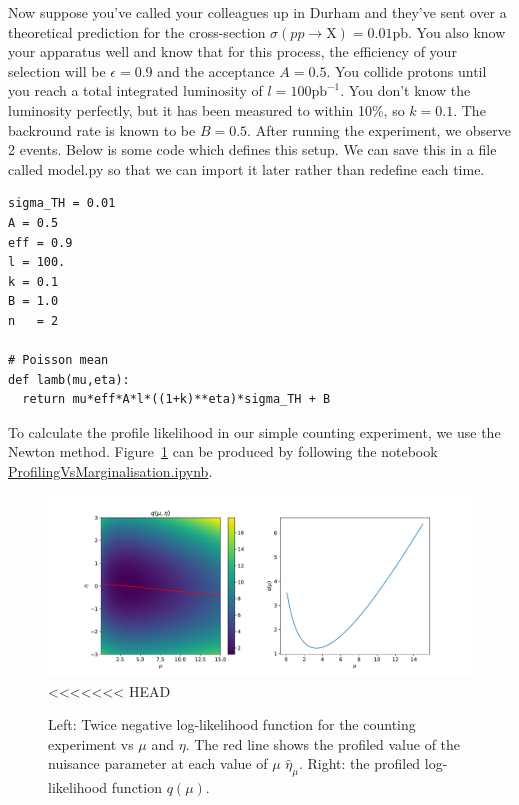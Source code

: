 Now suppose you've called your colleagues up in Durham and they've sent over a theoretical prediction for the cross-section $\sigma(pp\rightarrow \mathrm{X}) = 0.01$pb. You also know your apparatus well and know that for this process, the efficiency of your selection will be $\epsilon=0.9$ and the acceptance $A=0.5$. You collide protons until you reach a total integrated luminosity of $l=100\mathrm{pb}^{-1}$. You don't know the luminosity perfectly, but it has been measured to within 10\%, so $k=0.1$. The backround rate is known to be $B=0.5 $. After running the experiment, we observe 2 events. Below is some code which defines this setup. We can save this in a file called \textsf{model.py} so that we can import it later rather than redefine each time.
\begin{lstlisting}[style = Python]
sigma_TH = 0.01
A = 0.5 
eff = 0.9 
l = 100. 
k = 0.1 
B = 1.0
n   = 2

# Poisson mean
def lamb(mu,eta):
  return mu*eff*A*l*((1+k)**eta)*sigma_TH + B
\end{lstlisting}

To calculate the profile likelihood in our simple counting experiment, we use the Newton method. Figure~\ref{fig:profiledlikelihoodex_counting} can be produced 
by following the notebook \href{https://github.com/nucleosynthesis/PGStatistics/blob/main/notebooks/ProfilingVsMarginalisation.ipynb}{\textsf{ProfilingVsMarginalisation.ipynb}}.

\begin{figure}[hbt!]
    \centering
    \includegraphics[width=\textwidth]{figures/Hypotest/prof_lh_ex.pdf}
<<<<<<< HEAD
    \caption{Left: Twice negative log-likelihood function for the counting experiment vs 
    $\mu$ and $\eta$. The red line shows the profiled value of the nuisance parameter at each value of $\mu$ $\hat{\eta}_{\mu}$. Right: the profiled log-likelihood function $q(\mu)$.}
    \label{fig:profiledlikelihoodex_counting}
\end{figure}

